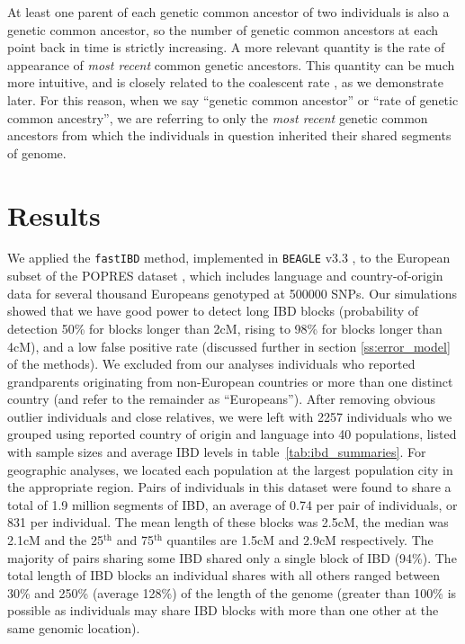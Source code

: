 \documentclass{article}
\begin{document}
At least one parent of each genetic common ancestor of two individuals is also a genetic common ancestor, 
so the number of genetic common ancestors at each point back in time is strictly increasing.
A more relevant quantity is the rate of appearance of {\em most recent} common genetic ancestors.
This quantity can be much more intuitive, and is closely related to the coalescent rate \citep{hudson1990gene},
as we demonstrate later.
For this reason, when we say ``genetic common ancestor'' or ``rate of genetic common ancestry'',
we are referring to only the {\em most recent} genetic common ancestors from which the individuals in question
inherited their shared segments of genome.  


\section{Results}


We applied the {\tt fastIBD} method, implemented in {\tt BEAGLE} v3.3 \citep{browning2011powerful},
to the European subset of the POPRES dataset \citep[dbgap accession phs000145.v1.p1,][]{nelson2008population},
which includes language and country-of-origin data for several thousand Europeans genotyped at 500000 SNPs.
Our simulations showed that we have good power to detect long IBD blocks
(probability of detection 50\% for blocks longer than 2cM, rising to 98\% for blocks longer than 4cM),
and a low false positive rate (discussed further in section \ref{ss:error_model} of the methods).
We excluded from our analyses individuals who reported grandparents originating from non-European countries or more than one distinct country
(and refer to the remainder as ``Europeans'').
After removing obvious outlier individuals and close relatives, 
we were left with 2257 individuals
who we grouped using reported country of origin and language into 40 populations,
listed with sample sizes and average IBD levels in table~\ref{tab:ibd_summaries}.
For geographic analyses, we located each population at the largest population city in the appropriate region.
Pairs of individuals in this dataset were found to share a total of 1.9 million segments of IBD, 
an average of 0.74 per pair of individuals,
or 831 per individual.
The mean length of these blocks was 2.5cM, the median was 2.1cM
and the 25$^\mathrm{th}$ and 75$^\mathrm{th}$ quantiles are 1.5cM and 2.9cM respectively.
The majority of pairs sharing some IBD shared only a single block of IBD (94\%).
The total length of IBD blocks an individual shares with all others ranged between 30\% and 250\% (average 128\%) of the length of the genome
(greater than 100\% is possible as individuals may share IBD blocks with more than one other at the same genomic location).   
\end{document}

